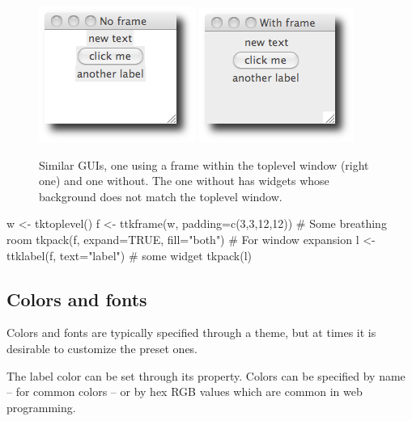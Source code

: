 \begin{figure}
  \centering
  \includegraphics[width=.4\textwidth]{fig-tcltk-no-frame}
  \includegraphics[width=.4\textwidth]{fig-tcltk-with-frame}
  \caption{Similar GUIs, one using a frame within the toplevel window
    (right one) and one without. The one without has widgets whose background does not match the toplevel window.}
  \label{fig:tcltk-frame-noframe-example}
\end{figure}




\begin{Schunk}
\begin{Sinput}
 w <- tktoplevel()
 f <- ttkframe(w, padding=c(3,3,12,12))  # Some breathing room
 tkpack(f, expand=TRUE, fill="both")     # For window expansion
 l <- ttklabel(f,  text="label")         # some widget
 tkpack(l)
\end{Sinput}
\end{Schunk}


\subsection{Colors and fonts}
\label{sec:tcltk:overview:colors-fonts}
Colors and fonts are typically specified through a theme, but at times
it is desirable to customize the preset ones.

The label color can be set through its 
property. Colors can be specified by name -- for common colors -- or
by hex RGB values which are common in web programming.
\begin{Schunk}
\end{Schunk}

